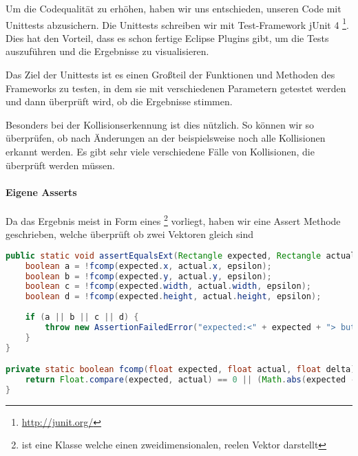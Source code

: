 
Um die Codequalität zu erhöhen, haben wir uns entschieden, unseren Code mit Unittests abzusichern.
Die Unittests schreiben wir mit Test-Framework jUnit 4 \footnote{\url{http://junit.org/}}. Dies hat den Vorteil, dass es schon fertige Eclipse Plugins gibt, um die Tests auszuführen und die Ergebnisse zu visualisieren.


Das Ziel der Unittests ist es einen Großteil der Funktionen und Methoden des Frameworks zu testen, in dem sie mit verschiedenen Parametern getestet werden und dann überprüft wird, ob die Ergebnisse stimmen. \cite[S 62]{JUNIT}

Besonders bei der Kollisionserkennung ist dies nützlich. So können wir so überprüfen, ob nach Änderungen an der  beispielsweise noch alle Kollisionen erkannt werden. Es gibt sehr viele verschiedene Fälle von Kollisionen, die überprüft werden müssen.

\paragraph{Eigene Asserts}

Da das Ergebnis meist in Form eines \footnote{ ist eine Klasse welche einen zweidimensionalen, reelen Vektor darstellt} vorliegt, haben wir eine Assert Methode geschrieben, welche überprüft ob zwei Vektoren gleich sind

\doinline
\begin{lstlisting}[caption=Eine Assert Methode für zwei Vektoren, title=\hspace{0 pt}, language=java]
public static void assertEqualsExt(Rectangle expected, Rectangle actual, float epsilon) {
	boolean a = !fcomp(expected.x, actual.x, epsilon);
	boolean b = !fcomp(expected.y, actual.y, epsilon);
	boolean c = !fcomp(expected.width, actual.width, epsilon);
	boolean d = !fcomp(expected.height, actual.height, epsilon);
	
	if (a || b || c || d) {
		throw new AssertionFailedError("expected:<" + expected + "> but was:<" + actual + ">" );
	}
}

private static boolean fcomp(float expected, float actual, float delta) {
	return Float.compare(expected, actual) == 0 || (Math.abs(expected - actual) <= delta);
}
\end{lstlisting}


